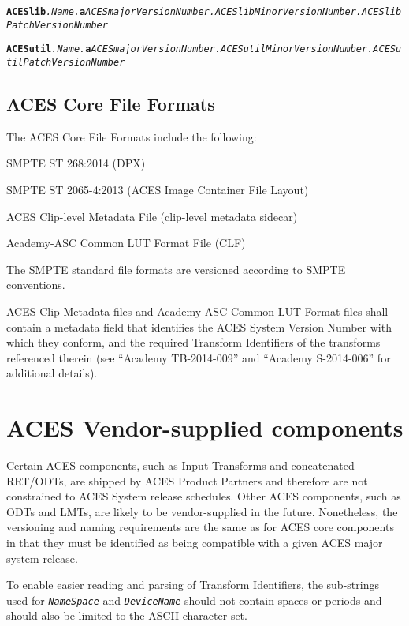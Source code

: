 \begin{sloppypar}
\texttt{\textbf{ACESlib}\textit{.Name.\-}\textbf{a}\textit{ACESmajorVersionNumber.ACESlibMinorVersionNumber.ACESlib\-Patch\-Version\-Number}}
\end{sloppypar}

\begin{sloppypar}
\texttt{\textbf{ACESutil}\textit{.Name.\-}\textbf{a}\textit{ACESmajorVersionNumber.ACESutilMinorVersionNumber.ACES\-utilPatchVersionNumber}}
\end{sloppypar}


\subsection{ACES Core File Formats}
The ACES Core File Formats include the following:

\begin{listize}[-]
	\item SMPTE ST 268:2014 (DPX)
	\item SMPTE ST 2065-4:2013 (ACES Image Container File Layout)
	\item ACES Clip-level Metadata File (clip-level metadata sidecar)
	\item Academy-ASC Common LUT Format File (CLF)
\end{listize}

The SMPTE standard file formats are versioned according to SMPTE conventions.

ACES Clip Metadata files and Academy-ASC Common LUT Format files shall contain a metadata field that identifies the ACES System Version Number with which they conform, and the required Transform Identifiers of the transforms referenced therein (see ``Academy TB-2014-009'' and ``Academy S-2014-006'' for additional details).

\section{ACES Vendor-supplied components}
Certain ACES components, such as Input Transforms and concatenated RRT/ODTs, are shipped by ACES Product Partners and therefore are not constrained to ACES System release schedules. Other ACES components, such as ODTs and LMTs, are likely to be vendor-supplied in the future. Nonetheless, the versioning and naming requirements are the same as for ACES core components in that they must be identified as being compatible with a given ACES major system release.

To enable easier reading and parsing of Transform Identifiers, the sub-strings used for \texttt{\textit{NameSpace}} and \texttt{\textit{DeviceName}} should not contain spaces or periods and should also be limited to the ASCII character set.

